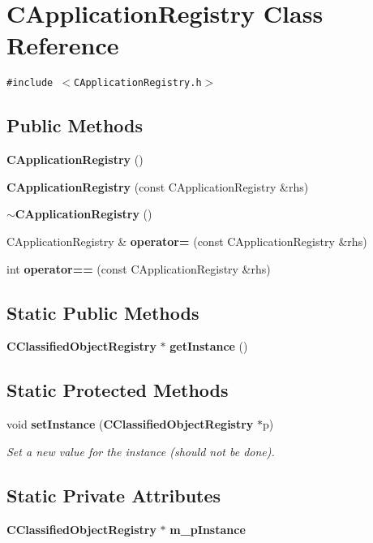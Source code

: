 \section{CApplication\-Registry  Class Reference}
\label{classCApplicationRegistry}
{\tt \#include $<$CApplication\-Registry.h$>$}

\subsection*{Public Methods}
\begin{CompactItemize}
\item 
{\bf CApplication\-Registry} ()
\item 
{\bf CApplication\-Registry} (const CApplication\-Registry \&rhs)
\item 
{\bf $\sim$CApplication\-Registry} ()
\item 
CApplication\-Registry \& {\bf operator=} (const CApplication\-Registry \&rhs)
\item 
int {\bf operator==} (const CApplication\-Registry \&rhs)
\end{CompactItemize}
\subsection*{Static Public Methods}
\begin{CompactItemize}
\item 
{\bf CClassified\-Object\-Registry} $\ast$ {\bf get\-Instance} ()
\end{CompactItemize}
\subsection*{Static Protected Methods}
\begin{CompactItemize}
\item 
void {\bf set\-Instance} ({\bf CClassified\-Object\-Registry} $\ast$p)
\begin{CompactList}\small\item\em Set a new value for the instance (should not be done).\item\end{CompactList}\end{CompactItemize}
\subsection*{Static Private Attributes}
\begin{CompactItemize}
\item 
{\bf CClassified\-Object\-Registry} $\ast$ {\bf m\_\-p\-Instance}
\end{CompactItemize}


